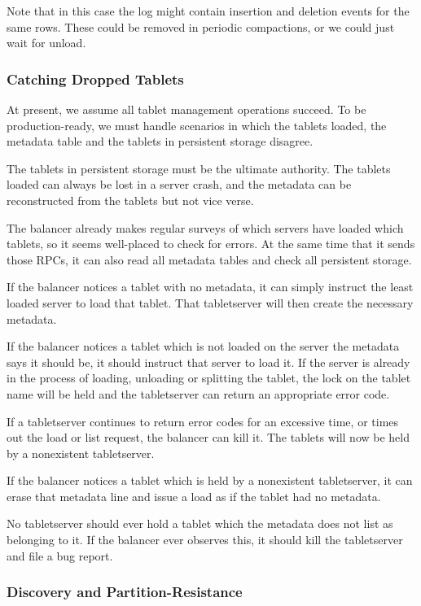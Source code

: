 \documentclass[11pt]{article}
\begin{document}
Note that in this case the log might contain insertion and deletion events for the same rows.  These could be removed in periodic compactions, or we could just wait for unload.

\subsubsection{Catching Dropped Tablets}

At present, we assume all tablet management operations succeed.  To be production-ready, we must handle scenarios in which the tablets loaded, the metadata table and the tablets in persistent storage disagree.

The tablets in persistent storage must be the ultimate authority.  The tablets loaded can always be lost in a server crash, and the metadata can be reconstructed from the tablets but not vice verse.

The balancer already makes regular surveys of which servers have loaded which tablets, so it seems well-placed to check for errors.  At the same time that it sends those RPCs, it can also read all metadata tables and check all persistent storage.

If the balancer notices a tablet with no metadata, it can simply instruct the least loaded server to load that tablet.  That tabletserver will then create the necessary metadata.

If the balancer notices a tablet which is not loaded on the server the metadata says it should be, it should instruct that server to load it.  If the server is already in the process of loading, unloading or splitting the tablet, the lock on the tablet name will be held and the tabletserver can return an appropriate error code.

If a tabletserver continues to return error codes for an excessive time, or times out the load or list request, the balancer can kill it.  The tablets will now be held by a nonexistent tabletserver.

If the balancer notices a tablet which is held by a nonexistent tabletserver, it can erase that metadata line and issue a load as if the tablet had no metadata.

No tabletserver should ever hold a tablet which the metadata does not list as belonging to it.  If the balancer ever observes this, it should kill the tabletserver and file a bug report.

\subsubsection{Discovery and Partition-Resistance}
\end{document}
